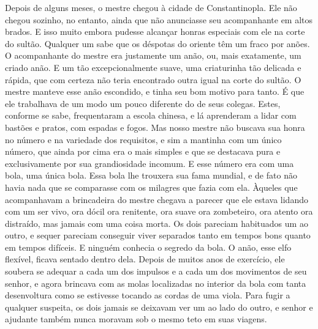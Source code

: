 Depois de alguns meses, o mestre chegou à cidade de Constantinopla. Ele
não chegou sozinho, no entanto, ainda que não anunciasse seu
acompanhante em altos brados. E isso muito embora pudesse alcançar
honras especiais com ele na corte do sultão. Qualquer um sabe que os
déspotas do oriente têm um fraco por anões. O acompanhante do mestre era
justamente um anão, ou, mais exatamente, um criado anão. E um tão
excepcionalmente suave, uma criaturinha tão delicada e rápida, que com
certeza não teria encontrado outra igual na corte do sultão. O mestre
manteve esse anão escondido, e tinha seu bom motivo para tanto. É que
ele trabalhava de um modo um pouco diferente do de seus colegas. Estes,
conforme se sabe, frequentaram a escola chinesa, e lá aprenderam a lidar
com bastões e pratos, com espadas e fogos. Mas nosso mestre não buscava
sua honra no número e na variedade dos requisitos, e sim a mantinha com
um único número, que ainda por cima era o mais simples e que se
destacava pura e exclusivamente por sua grandiosidade incomum. E esse
número era com uma bola, uma única bola. Essa bola lhe trouxera sua fama
mundial, e de fato não havia nada que se comparasse com os milagres que
fazia com ela. Àqueles que acompanhavam a brincadeira do mestre chegava
a parecer que ele estava lidando com um ser vivo, ora dócil ora
renitente, ora suave ora zombeteiro, ora atento ora distraído, mas
jamais com uma coisa morta. Os dois pareciam habituados um ao outro, e
sequer pareciam conseguir viver separados tanto em tempos bons quanto em
tempos difíceis. E ninguém conhecia o segredo da bola. O anão, esse elfo
flexível, ficava sentado dentro dela. Depois de muitos anos de
exercício, ele soubera se adequar a cada um dos impulsos e a cada um dos
movimentos de seu senhor, e agora brincava com as molas localizadas no
interior da bola com tanta desenvoltura como se estivesse tocando as
cordas de uma viola. Para fugir a qualquer suspeita, os dois jamais se
deixavam ver um ao lado do outro, e senhor e ajudante também nunca
moravam sob o mesmo teto em suas viagens.

